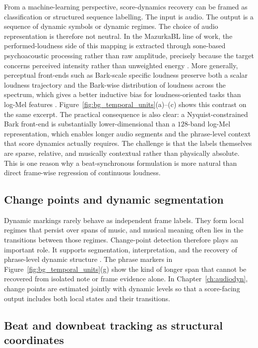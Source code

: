 From a machine-learning perspective, score-dynamics recovery can be framed as classification or structured sequence labelling. The input is audio. The output is a sequence of dynamic symbols or dynamic regimes. The choice of audio representation is therefore not neutral. In the MazurkaBL line of work, the performed-loudness side of this mapping is extracted through sone-based psychoacoustic processing rather than raw amplitude, precisely because the target concerns perceived intensity rather than unweighted energy \cite{kosta2017thesis}. More generally, perceptual front-ends such as Bark-scale specific loudness preserve both a scalar loudness trajectory and the Bark-wise distribution of loudness across the spectrum, which gives a better inductive bias for loudness-oriented tasks than log-Mel features \cite{narang2024automatic,he2026dynest}. Figure~\ref{fig:bg_temporal_units}(a)--(c) shows this contrast on the same excerpt. The practical consequence is also clear: a Nyquist-constrained Bark front-end is substantially lower-dimensional than a $128$-band log-Mel representation, which enables longer audio segments and the phrase-level context that score dynamics actually requires. The challenge is that the labels themselves are sparse, relative, and musically contextual rather than physically absolute. This is one reason why a beat-synchronous formulation is more natural than direct frame-wise regression of continuous loudness.

\subsection{Change points and dynamic segmentation}
\label{sec:bg:scoredyn:changepoints}

Dynamic markings rarely behave as independent frame labels. They form local regimes that persist over spans of music, and musical meaning often lies in the transitions between those regimes. Change-point detection therefore plays an important role. It supports segmentation, interpretation, and the recovery of phrase-level dynamic structure \cite{kosta2018mazurkabl,kosta2017thesis}. The phrase markers in Figure~\ref{fig:bg_temporal_units}(g) show the kind of longer span that cannot be recovered from isolated note or frame evidence alone. In Chapter~\ref{ch:audiodyn}, change points are estimated jointly with dynamic levels so that a score-facing output includes both local states and their transitions.

\subsection{Beat and downbeat tracking as structural coordinates}
\label{sec:bg:scoredyn:metrical}

